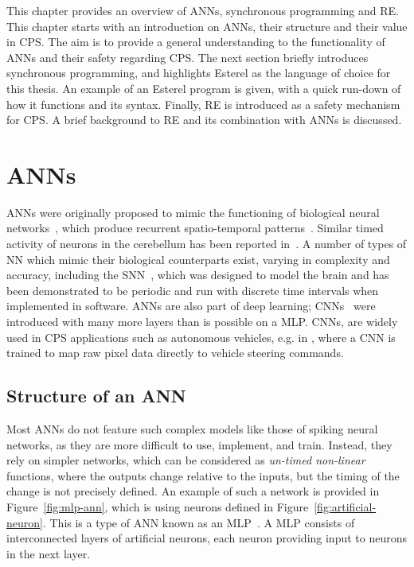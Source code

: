 This chapter provides an overview of \acfp{ANN}, synchronous programming and \acf{RE}.
This chapter starts with an introduction on \acp{ANN}, their structure and their value in \ac{CPS}.
The aim is to provide a general understanding to the functionality of \acp{ANN} and their safety regarding \ac{CPS}.
The next section briefly introduces synchronous programming, and highlights Esterel as the language of choice for this thesis. 
An example of an Esterel program is given, with a quick run-down of how it functions and its syntax.
Finally, \ac{RE} is introduced as a safety mechanism for \ac{CPS}.
A brief background to \ac{RE} and its combination with \acp{ANN} is discussed.

\section{\acfp{ANN}}
\acp{ANN} were originally proposed to mimic the functioning of  biological neural networks~\cite{kohonen1988introduction}, which produce recurrent spatio-temporal patterns~\cite{rolston2007precisely}. 
Similar timed activity of neurons in the cerebellum has been reported in~\cite{bullock1994neural, moore1989adaptively}. 
A number of types of \ac{NN} which mimic their biological counterparts exist, varying in complexity and accuracy, including the \ac{SNN}~\cite{izhikevich2003spiking,maass1997spiking}, which was designed to model the brain and has been demonstrated to be periodic and run with discrete time intervals when implemented in software. 
\acp{ANN} are also part of deep learning; \acfp{CNN}~\cite{schmidhuber2015deep} were introduced with many more layers than is possible on a \ac{MLP}. 
\acp{CNN}, are widely used in \ac{CPS} applications such as autonomous vehicles, e.g. in \cite{EndToEndLearningForSelfDrivingCars}, where a \ac{CNN} is trained to map raw pixel data directly to vehicle steering commands.

\subsection{Structure of an \acf{ANN}}
Most \acp{ANN} do not feature such complex models like those of spiking neural networks, as they are more difficult to use, implement, and train. 
Instead, they rely on simpler networks, which can be considered as \emph{un-timed non-linear} functions, where the outputs change relative to the inputs, but the timing of the change is not precisely defined. 
An example of such a network is provided in Figure~\ref{fig:mlp-ann}, which is using neurons defined in Figure~\ref{fig:artificial-neuron}. 
This is a type of \ac{ANN} known as an \acf{MLP}~\cite{yegnanarayana1994artificial}.
A \ac{MLP} consists of interconnected layers of artificial neurons, each neuron providing input to neurons in the next layer.

